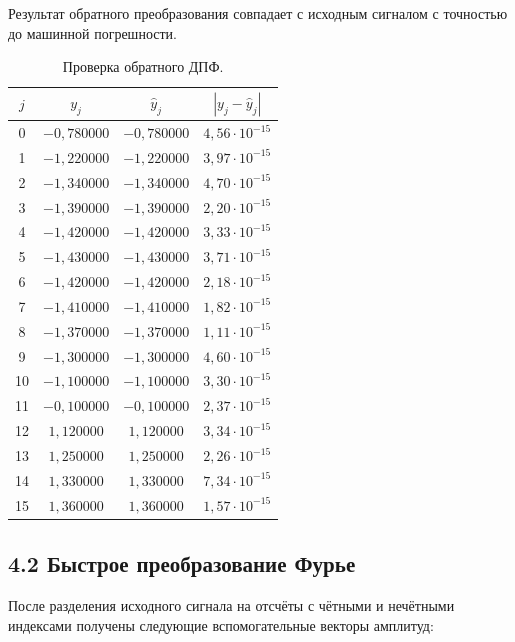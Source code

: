 \documentclass[14pt,a4paper]{extarticle}
\begin{document}
Результат обратного преобразования совпадает с исходным сигналом с точностью до машинной погрешности.

\begin{table}[H]
\centering
\caption{Проверка обратного ДПФ.}
\small
\begin{tabular}{|c|c|c|c|}
\hline
$j$ & $y_j$ & $\hat y_j$ & $|y_j-\hat y_j|$ \\ \hline
0 & $-0{,}780000$ & $-0{,}780000$ & $4{,}56\cdot10^{-15}$ \\ \hline
1 & $-1{,}220000$ & $-1{,}220000$ & $3{,}97\cdot10^{-15}$ \\ \hline
2 & $-1{,}340000$ & $-1{,}340000$ & $4{,}70\cdot10^{-15}$ \\ \hline
3 & $-1{,}390000$ & $-1{,}390000$ & $2{,}20\cdot10^{-15}$ \\ \hline
4 & $-1{,}420000$ & $-1{,}420000$ & $3{,}33\cdot10^{-15}$ \\ \hline
5 & $-1{,}430000$ & $-1{,}430000$ & $3{,}71\cdot10^{-15}$ \\ \hline
6 & $-1{,}420000$ & $-1{,}420000$ & $2{,}18\cdot10^{-15}$ \\ \hline
7 & $-1{,}410000$ & $-1{,}410000$ & $1{,}82\cdot10^{-15}$ \\ \hline
8 & $-1{,}370000$ & $-1{,}370000$ & $1{,}11\cdot10^{-15}$ \\ \hline
9 & $-1{,}300000$ & $-1{,}300000$ & $4{,}60\cdot10^{-15}$ \\ \hline
10 & $-1{,}100000$ & $-1{,}100000$ & $3{,}30\cdot10^{-15}$ \\ \hline
11 & $-0{,}100000$ & $-0{,}100000$ & $2{,}37\cdot10^{-15}$ \\ \hline
12 & $1{,}120000$ & $1{,}120000$ & $3{,}34\cdot10^{-15}$ \\ \hline
13 & $1{,}250000$ & $1{,}250000$ & $2{,}26\cdot10^{-15}$ \\ \hline
14 & $1{,}330000$ & $1{,}330000$ & $7{,}34\cdot10^{-15}$ \\ \hline
15 & $1{,}360000$ & $1{,}360000$ & $1{,}57\cdot10^{-15}$ \\ \hline
\end{tabular}
\end{table}

\subsection*{4.2 Быстрое преобразование Фурье}
После разделения исходного сигнала на отсчёты с чётными и нечётными индексами получены следующие вспомогательные векторы амплитуд:
\end{document}
